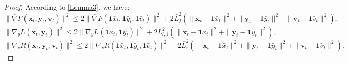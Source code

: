 \documentclass{article}
\theoremstyle{plain}
\theoremstyle{definition}
\theoremstyle{remark}
\begin{document}
\begin{proof}
According to \cref{Lemma3}, we have:
\begin{equation}
   \|\bar{\nabla} F(\mathbf{x}_t, \mathbf{y}_t, \mathbf{v}_t)\|^2 \leq 2\|\bar{\nabla} F(\mathbf{1}\bar{x}_t, \mathbf{1}\bar{y}_t, \mathbf{1}\bar{v}_t)\|^2 + 2\bar{L}_{f}^2 (\|\mathbf{x}_t - \mathbf{1}\bar{x}_t\|^2 + \|\mathbf{y}_t - \mathbf{1}\bar{y}_t\|^2+ \|\mathbf{v}_t - \mathbf{1}\bar{v}_t\|^2),\label{eq121}
\end{equation}
\begin{equation}
   \|\nabla_y L(\mathbf{x}_t, \mathbf{y}_t)\|^2 \leq 2\|\nabla_yL(\mathbf{1}\bar{x}_t, \mathbf{1}\bar{y}_t)\|^2 + 2L_{l,1}^2 (\|\mathbf{x}_t - \mathbf{1}\bar{x}_t\|^2 + \|\mathbf{y}_t - \mathbf{1}\bar{y}_t\|^2),\label{eq122}
\end{equation}
\begin{equation}
   \|\nabla_v R(\mathbf{x}_t, \mathbf{y}_t, \mathbf{v}_t)\|^2 \leq 2\|\nabla_v R(\mathbf{1}\bar{x}_t, \mathbf{1}\bar{y}_t, \mathbf{1}\bar{v}_t)\|^2 + 2\bar{L}_r^2( \|\mathbf{x}_t - \mathbf{1}\bar{x}_t\|^2 + \|\mathbf{y}_t - \mathbf{1}\bar{y}_t\|^2+ \|\mathbf{v}_t - \mathbf{1}\bar{v}_t\|^2).\label{eq123}
\end{equation}


\end{proof}
\end{document}
